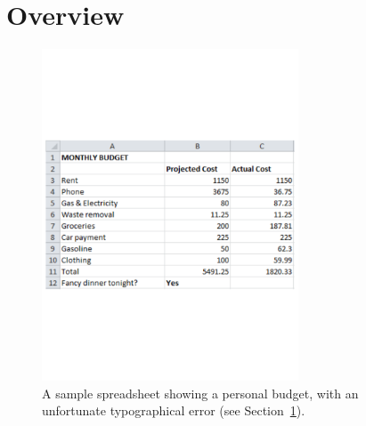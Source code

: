 \section{Overview}
\label{sec:overview}


\begin{figure}[!t]
\centering
\includegraphics[width=3in]{overview-example}
  \caption{A sample spreadsheet showing a personal budget, with an unfortunate typographical error (see Section~\ref{sec:overview}).\label{fig:personal_budget}}
\end{figure}

